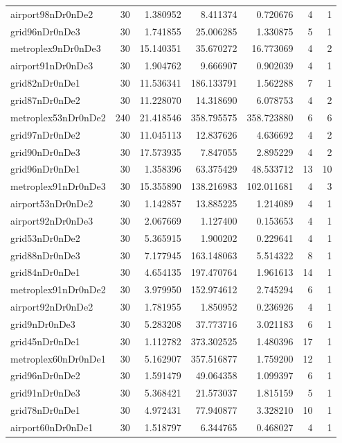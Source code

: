 \documentclass[../../../thesis.tex]{subfiles}
\begin{document}
\begin{longtable}{|l|r|r|r|r|r|r|}
airport98nDr0nDe2 & 30 & 1.380952 & 8.411374 & 0.720676 & 4 & 1 \\
grid96nDr0nDe3 & 30 & 1.741855 & 25.006285 & 1.330875 & 5 & 1 \\
metroplex9nDr0nDe3 & 30 & 15.140351 & 35.670272 & 16.773069 & 4 & 2 \\
airport91nDr0nDe3 & 30 & 1.904762 & 9.666907 & 0.902039 & 4 & 1 \\
grid82nDr0nDe1 & 30 & 11.536341 & 186.133791 & 1.562288 & 7 & 1 \\
grid87nDr0nDe2 & 30 & 11.228070 & 14.318690 & 6.078753 & 4 & 2 \\
metroplex53nDr0nDe2 & 240 & 21.418546 & 358.795575 & 358.723880 & 6 & 6 \\
grid97nDr0nDe2 & 30 & 11.045113 & 12.837626 & 4.636692 & 4 & 2 \\
grid90nDr0nDe3 & 30 & 17.573935 & 7.847055 & 2.895229 & 4 & 2 \\
grid96nDr0nDe1 & 30 & 1.358396 & 63.375429 & 48.533712 & 13 & 10 \\
metroplex91nDr0nDe3 & 30 & 15.355890 & 138.216983 & 102.011681 & 4 & 3 \\
airport53nDr0nDe2 & 30 & 1.142857 & 13.885225 & 1.214089 & 4 & 1 \\
airport92nDr0nDe3 & 30 & 2.067669 & 1.127400 & 0.153653 & 4 & 1 \\
grid53nDr0nDe2 & 30 & 5.365915 & 1.900202 & 0.229641 & 4 & 1 \\
grid88nDr0nDe3 & 30 & 7.177945 & 163.148063 & 5.514322 & 8 & 1 \\
grid84nDr0nDe1 & 30 & 4.654135 & 197.470764 & 1.961613 & 14 & 1 \\
metroplex91nDr0nDe2 & 30 & 3.979950 & 152.974612 & 2.745294 & 6 & 1 \\
airport92nDr0nDe2 & 30 & 1.781955 & 1.850952 & 0.236926 & 4 & 1 \\
grid9nDr0nDe3 & 30 & 5.283208 & 37.773716 & 3.021183 & 6 & 1 \\
grid45nDr0nDe1 & 30 & 1.112782 & 373.302525 & 1.480396 & 17 & 1 \\
metroplex60nDr0nDe1 & 30 & 5.162907 & 357.516877 & 1.759200 & 12 & 1 \\
grid96nDr0nDe2 & 30 & 1.591479 & 49.064358 & 1.099397 & 6 & 1 \\
grid91nDr0nDe3 & 30 & 5.368421 & 21.573037 & 1.815159 & 5 & 1 \\
grid78nDr0nDe1 & 30 & 4.972431 & 77.940877 & 3.328210 & 10 & 1 \\
airport60nDr0nDe1 & 30 & 1.518797 & 6.344765 & 0.468027 & 4 & 1 \\

\end{longtable}
\end{document}
